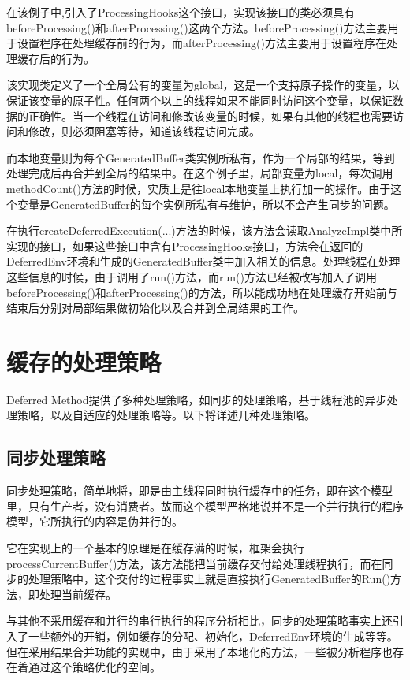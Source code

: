 在该例子中,引入了ProcessingHooks这个接口，实现该接口的类必须具有beforeProcessing()和afterProcessing()这两个方法。beforeProcessing()方法主要用于设置程序在处理缓存前的行为，而afterProcessing()方法主要用于设置程序在处理缓存后的行为。

该实现类定义了一个全局公有的变量为global，这是一个支持原子操作的变量，以保证该变量的原子性。任何两个以上的线程如果不能同时访问这个变量，以保证数据的正确性。当一个线程在访问和修改该变量的时候，如果有其他的线程也需要访问和修改，则必须阻塞等待，知道该线程访问完成。

而本地变量则为每个GeneratedBuffer类实例所私有，作为一个局部的结果，等到处理完成后再合并到全局的结果中。在这个例子里，局部变量为local，每次调用methodCount()方法的时候，实质上是往local本地变量上执行加一的操作。由于这个变量是GeneratedBuffer的每个实例所私有与维护，所以不会产生同步的问题。

在执行createDeferredExecution(...)方法的时候，该方法会读取AnalyzeImpl类中所实现的接口，如果这些接口中含有ProcessingHooks接口，方法会在返回的DeferredEnv环境和生成的GeneratedBuffer类中加入相关的信息。处理线程在处理这些信息的时候，由于调用了run()方法，而run()方法已经被改写加入了调用beforeProcessing()和afterProcessing()的方法，所以能成功地在处理缓存开始前与结束后分别对局部结果做初始化以及合并到全局结果的工作。

\section{缓存的处理策略}

Deferred Method提供了多种处理策略，如同步的处理策略，基于线程池的异步处理策略，以及自适应的处理策略等。以下将详述几种处理策略。

\subsection{同步处理策略}

同步处理策略，简单地将，即是由主线程同时执行缓存中的任务，即在这个模型里，只有生产者，没有消费者。故而这个模型严格地说并不是一个并行执行的程序模型，它所执行的内容是伪并行的。

它在实现上的一个基本的原理是在缓存满的时候，框架会执行processCurrentBuffer()方法，该方法能把当前缓存交付给处理线程执行，而在同步的处理策略中，这个交付的过程事实上就是直接执行GeneratedBuffer的Run()方法，即处理当前缓存。

与其他不采用缓存和并行的串行执行的程序分析相比，同步的处理策略事实上还引入了一些额外的开销，例如缓存的分配、初始化，DeferredEnv环境的生成等等。但在采用结果合并功能的实现中，由于采用了本地化的方法，一些被分析程序也存在着通过这个策略优化的空间。


